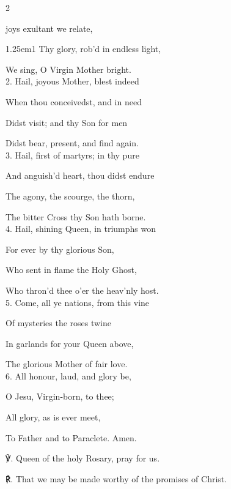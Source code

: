 \begin{paracol}{2}

\switchcolumn

\secondEvensong
{}

\secondEvensongHymn
{} joys exultant we relate,


\begin{hangparas}{1.25em}{1}
Thy glory, rob'd in endless light,

We sing, O Virgin Mother bright.\\

2. Hail, joyous Mother, blest indeed

When thou conceivedst, and in need

Didst visit; and thy Son for men

Didst bear, present, and find again.\\

3. Hail, first of martyrs; in thy pure

And anguish'd heart, thou didst endure

The agony, the scourge, the thorn,

The bitter Cross thy Son hath borne.\\

4. Hail, shining Queen, in triumphs won

For ever by thy glorious Son,

Who sent in flame the Holy Ghost,

Who thron'd thee o’er the heav'nly host.\\

5. Come, all ye nations, from this vine

Of mysteries the roses twine

In garlands for your Queen above,

The glorious Mother of fair love.\\

6. All honour, laud, and glory be,

O Jesu, Virgin-born, to thee;

All glory, as is ever meet,

To Father and to Paraclete. Amen.\\
\end{hangparas}

℣. Queen of the holy Rosary, pray for us.

℟. That we may be made worthy of the promises of Christ.


\fussy	
\end{paracol}

